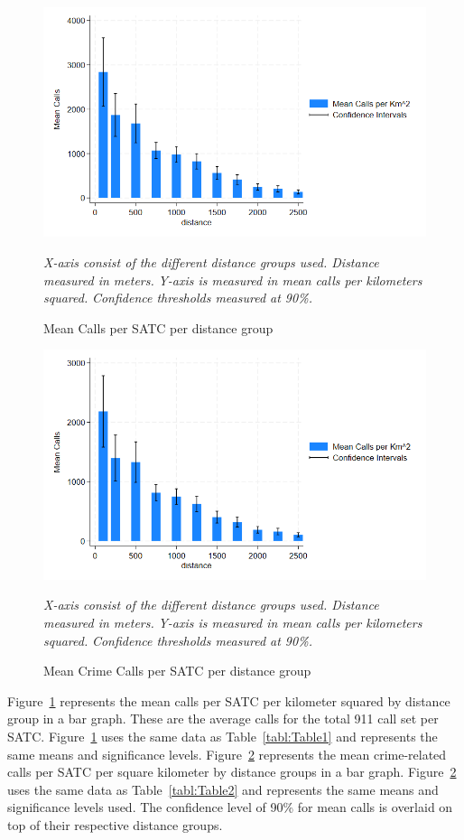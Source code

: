 \documentclass[12pt]{article}
\begin{document}
\begin{figure}[htbp]
    \centering
\includegraphics[width=0.75\linewidth]{Reproducibility Package/Visual Graphics/CI_Graph.png}
    \caption{Mean Calls per SATC per distance group}
    \label{fig:Figure3}
     \textit{X-axis consist of the different distance groups used. Distance measured in meters.}
    \textit{Y-axis is measured in mean calls per kilometers squared.}
    \textit{Confidence thresholds measured at 90\%.}
\end{figure}

\begin{figure}[htbp]
    \centering
\includegraphics[width=0.75\linewidth]{Reproducibility Package/Visual Graphics/Crime_CI_Graph.png}
    \caption{Mean Crime Calls per SATC per distance group}
    \label{fig:Figure4}
        \textit{X-axis consist of the different distance groups used. Distance measured in meters.}
    \textit{Y-axis is measured in mean calls per kilometers squared.}
     \textit{Confidence thresholds measured at 90\%.}
\end{figure}

Figure~\ref{fig:Figure3} represents the mean calls per SATC per kilometer squared by distance group in a bar graph. These are the average calls for the total 911 call set per SATC. Figure~\ref{fig:Figure3} uses the same data as Table~\ref{tabl:Table1} and represents the same means and significance levels. Figure~\ref{fig:Figure4} represents the mean crime-related calls per SATC per square kilometer by distance groups in a bar graph. Figure~\ref{fig:Figure4} uses the same data as Table~\ref{tabl:Table2} and represents the same means and significance levels used. The confidence level of 90\% for mean calls is overlaid on top of their respective distance groups. 
\end{document}
